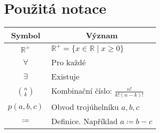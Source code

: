 \chapter*{Použitá notace}
\label{sec:notace}
\noindent
\begin{table}[h]
\begin{tabular}{c l}
    Symbol & \multicolumn{1}{c}{Význam} \\
    \toprule
    $\mathbb{R}^+$ & $\mathbb{R}^+=\{ x \in \mathbb{R} \mid x \geq 0 \}$ \\
    $ \forall$ & Pro každé \\
    $ \exists$ & Existuje \\
    $ \binom{n}{k}$ & Kombinační číslo: $\frac{n!}{k!(n-k)!}$ \\
    $ p(a, b, c)$ & Obvod trojúhelníku $a, b, c$ \\
    $ \coloneqq $ & Definice. Například $ a \coloneqq b - c$ \\
    
\end{tabular}
\end{table}